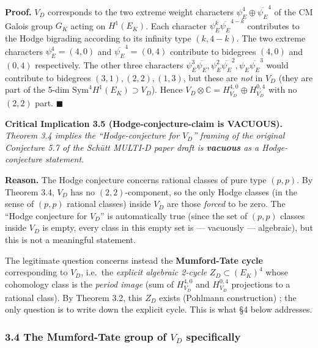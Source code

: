 \documentclass[
  11pt,
  a4paper,
]{article}
\begin{document}
\textbf{Proof.} \(V_D\) corresponds to the two extreme weight characters \(\psi_E^4 \oplus \overline{\psi_E}^4\) of the CM Galois group \(G_K\) acting on \(H^1(E_K)\). Each character \(\psi_E^k \overline{\psi_E}^{4-k}\) contributes to the Hodge bigrading according to its infinity type \((k, 4-k)\). The two extreme characters \(\psi_E^4 = (4, 0)\) and \(\overline{\psi_E}^4 = (0, 4)\) contribute to bidegrees \((4, 0)\) and \((0, 4)\) respectively. The other three characters \(\psi_E^3 \overline{\psi_E}, \psi_E^2 \overline{\psi_E}^2, \psi_E \overline{\psi_E}^3\) would contribute to bidegrees \((3, 1), (2, 2), (1, 3)\), but these are \emph{not} in \(V_D\) (they are part of the 5-dim \(\mathrm{Sym}^4 H^1(E_K) \supset V_D\)). Hence \(V_D \otimes \mathbb{C} = H^{4, 0}_{V_D} \oplus H^{0, 4}_{V_D}\) with no \((2, 2)\) part. \(\blacksquare\)

\textbf{Critical Implication 3.5 (Hodge-conjecture-claim is VACUOUS).} \emph{Theorem 3.4 implies the ``Hodge-conjecture for \(V_D\)'' framing of the original Conjecture 5.7 of the Schütt MULTI-D paper draft is \textbf{vacuous} as a Hodge-conjecture statement.}

\textbf{Reason.} The Hodge conjecture concerns rational classes of pure type \((p, p)\). By Theorem 3.4, \(V_D\) has no \((2, 2)\)-component, so the only Hodge classes (in the sense of \((p, p)\) rational classes) inside \(V_D\) are those \emph{forced} to be zero. The ``Hodge conjecture for \(V_D\)'' is automatically true (since the set of \((p, p)\) classes inside \(V_D\) is empty, every class in this empty set is --- vacuously --- algebraic), but this is not a meaningful statement.

The legitimate question concerns instead the \textbf{Mumford-Tate cycle} corresponding to \(V_D\), i.e.~the \emph{explicit algebraic 2-cycle} \(Z_D \subset (E_K)^4\) whose cohomology class is the \emph{period image} (sum of \(H^{4, 0}_{V_D}\) and \(H^{0, 4}_{V_D}\) projections to a rational class). By Theorem 3.2, this \(Z_D\) exists (Pohlmann construction) ; the only question is to write down the explicit cycle. This is what §4 below addresses.

\hypertarget{the-mumford-tate-group-of-v_d-specifically}{%
\subsubsection{\texorpdfstring{3.4 The Mumford-Tate group of \(V_D\) specifically}{3.4 The Mumford-Tate group of V\_D specifically}}\label{the-mumford-tate-group-of-v_d-specifically}}
\end{document}

